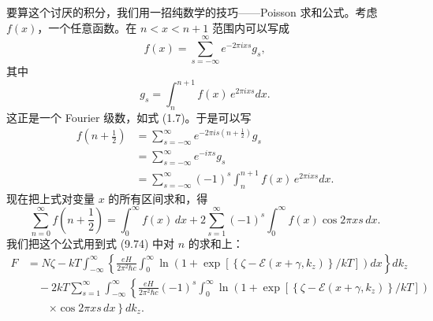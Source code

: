 要算这个讨厌的积分，我们用一招纯数学的技巧——Poisson 求和公式。考虑 $f(x)$，一个任意函数。在 $n<x<n+1$ 范围内可以写成
\begin{equation*}
f(x)=\sum_{s=-\infty}^{\infty}e^{-2\pi ixs}g_{s},
\tag{9.75}
\end{equation*}
其中
\begin{equation*}
g_{s}=\int_{n}^{n+1}f(x)\,e^{2\pi ixs}dx.
\tag{9.76}
\end{equation*}
这正是一个 Fourier 级数，如式 (1.7)。于是可以写
\begin{align*}
f\left(n+\frac{1}{2}\right)&=\sum_{s=-\infty}^{\infty}e^{-2\pi is(n+\frac{1}{2})}g_{s}\\
&=\sum_{s=-\infty}^{\infty}e^{-i\pi s}g_{s}\\
&=\sum_{s=-\infty}^{\infty}(-1)^{s}\int_{n}^{n+1}f(x)\,e^{2\pi ixs}dx.
\tag{9.77}
\end{align*}
现在把上式对变量 $x$ 的所有区间求和，得
\begin{equation*}
\sum_{n=0}^{\infty}f\left(n+\frac{1}{2}\right)=\int_{0}^{\infty}f(x)\,dx+2\sum_{s=1}^{\infty}(-1)^{s}\int_{0}^{\infty}f(x)\cos 2\pi xs\,dx.
\tag{9.78}
\end{equation*}
我们把这个公式用到式 (9.74) 中对 $n$ 的求和上：
\begin{align*}
F&=N\zeta-kT\int_{-\infty}^{\infty}\left\{\frac{eH}{2\pi^{2}\hbar c}\int_{0}^{\infty}\ln\left(1+\exp\left[\left\{\zeta-\mathcal{E}(x+\gamma,k_{z})\right\}/kT\right]\right)dx\right\}dk_{z}\\
&\quad-2kT\sum_{s=1}^{\infty}\int_{-\infty}^{\infty}\left\{\frac{eH}{2\pi^{2}\hbar c}(-1)^{s}\int_{0}^{\infty}\ln\left(1+\exp\left[\left\{\zeta-\mathcal{E}(x+\gamma,k_{z})\right\}/kT\right]\right)\right.\\
&\qquad\left.\times\cos 2\pi xs\,dx\right\}dk_{z}.
\tag{9.79}
\end{align*}


